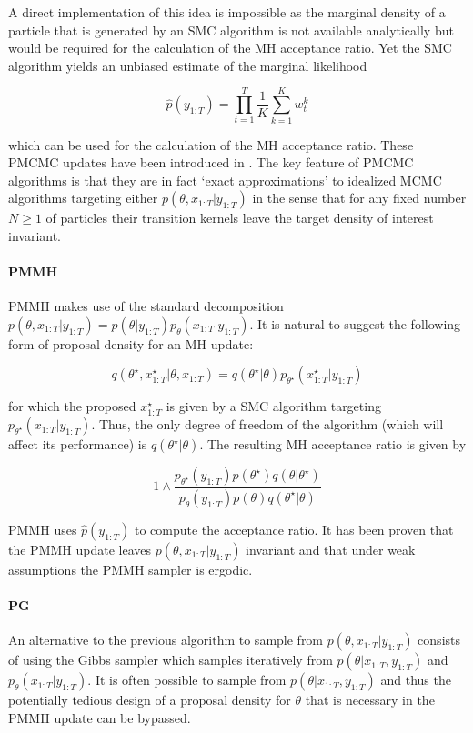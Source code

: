 A direct implementation of this idea is impossible as the marginal density of a particle that is generated by an \gls{SMC} algorithm is not available analytically but would be required for the calculation of the \gls{MH} acceptance ratio. Yet the \gls{SMC} algorithm yields an unbiased estimate of the marginal likelihood

$$ \hat{p}(y_{1:T}) = \prod_{t=1}^T \frac{1}{K} \sum_{k=1}^K w_t^k $$

which can be used for the calculation of the \gls{MH} acceptance ratio. 
These \gls{PMCMC} updates have been introduced in \cite{Andrieu:2010gc}.
The key feature of PMCMC algorithms is that they are in fact ‘exact approximations’ to idealized \gls{MCMC} algorithms targeting either $p(\theta, x_{1:T}|y_{1:T})$ in the sense that for any fixed number $N\ge1$ of particles their transition kernels leave the target density of interest invariant. 


\paragraph{\gls{PMMH}}
\gls{PMMH} makes use of the standard decomposition $p(\theta, x_{1:T}|y_{1:T}) = p(\theta | y_{1:T}) p_\theta(x_{1:T}|y_{1:T})$. 
It is natural to suggest the following form of proposal density for an \gls{MH} update:

$$ q\left( \theta^\star, x_{1:T}^\star | \theta, x_{1:T} \right) = q(\theta^\star|\theta) p_{\theta^\star}(x_{1:T}^\star|y_{1:T})$$

for which the proposed $x_{1:T}^\star$ is given by a \gls{SMC} algorithm targeting $p_{\theta^\star}(x_{1:T}|y_{1:T})$. Thus, the only degree of freedom of the algorithm (which will affect its performance) is $q(\theta^\star|\theta)$. The resulting \gls{MH} acceptance ratio is given by

$$ 1 \wedge \frac{p_{\theta^\star}(y_{1:T}) p(\theta^\star) q(\theta|\theta^\star)}{p_{\theta}(y_{1:T}) p(\theta) q(\theta^\star|\theta)} $$

\gls{PMMH} uses $\hat{p}(y_{1:T})$ to compute the acceptance ratio. It has been proven \cite{Andrieu:2010gc} that the PMMH update leaves $p(\theta, x_{1:T}|y_{1:T})$ invariant and that under weak assumptions the \gls{PMMH} sampler is ergodic.


\paragraph{\gls{PG}}
An alternative to the previous algorithm to sample from $p(\theta, x_{1:T}|y_{1:T})$ consists of using the Gibbs sampler which samples iteratively from $p(\theta|x_{1:T},y_{1:T})$ and $p_\theta(x_{1:T}|y_{1:T})$.
It is often possible to sample from $p(\theta|x_{1:T},y_{1:T})$ and thus the potentially tedious design of a proposal density for $\theta$ that is necessary in the \gls{PMMH} update can be bypassed.

